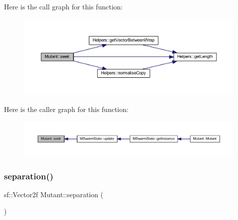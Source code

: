 Here is the call graph for this function\+:
\nopagebreak
\begin{figure}[H]
\begin{center}
\leavevmode
\includegraphics[width=350pt]{class_mutant_a5cdfb629154531e8f010930b072e14cc_cgraph}
\end{center}
\end{figure}
Here is the caller graph for this function\+:
\nopagebreak
\begin{figure}[H]
\begin{center}
\leavevmode
\includegraphics[width=350pt]{class_mutant_a5cdfb629154531e8f010930b072e14cc_icgraph}
\end{center}
\end{figure}
\mbox{\label{class_mutant_a0ea8c6678568932e57054f13c00d12d9}} 
\subsubsection{\texorpdfstring{separation()}{separation()}}
{\footnotesize\ttfamily sf\+::\+Vector2f Mutant\+::separation (\begin{DoxyParamCaption}{ }\end{DoxyParamCaption})}

